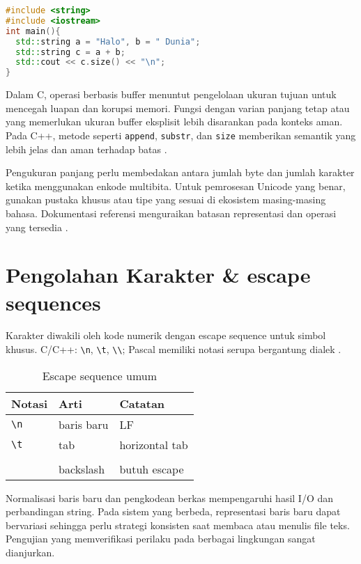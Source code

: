 \documentclass[../main.tex]{subfiles}
\begin{document}
\begin{lstlisting}[language=C++, caption={std::string di C++}]
#include <string>
#include <iostream>
int main(){
  std::string a = "Halo", b = " Dunia";
  std::string c = a + b;
  std::cout << c.size() << "\n";
}
\end{lstlisting}

Dalam C, operasi berbasis buffer menuntut pengelolaan ukuran tujuan untuk mencegah luapan dan korupsi memori. Fungsi dengan varian panjang tetap atau yang memerlukan ukuran buffer eksplisit lebih disarankan pada konteks aman. Pada C++, metode seperti \texttt{append}, \texttt{substr}, dan \texttt{size} memberikan semantik yang lebih jelas dan aman terhadap batas \parencite{cpp-strings}.

Pengukuran panjang perlu membedakan antara jumlah byte dan jumlah karakter ketika menggunakan enkode multibita. Untuk pemrosesan Unicode yang benar, gunakan pustaka khusus atau tipe yang sesuai di ekosistem masing-masing bahasa. Dokumentasi referensi menguraikan batasan representasi dan operasi yang tersedia \parencite{cpp-strings,iso-c-draft-n1570}.

\section{Pengolahan Karakter \& escape sequences}
Karakter diwakili oleh kode numerik dengan escape sequence untuk simbol khusus. C/C++: \texttt{\textbackslash n}, \texttt{\textbackslash t}, \texttt{\textbackslash\textbackslash}; Pascal memiliki notasi serupa bergantung dialek \parencite{iso-c-draft-n1570,free-pascal-docs}.

\begin{table}[h]
  \centering
  \caption{Escape sequence umum}
  \begin{tabular}{@{}lll@{}}
    \toprule
    Notasi & Arti & Catatan \\
    \midrule
    \texttt{\textbackslash n} & baris baru & LF \\
    \texttt{\textbackslash t} & tab & horizontal tab \\
    \texttt{\\} & backslash & butuh escape \\
    \bottomrule
  \end{tabular}
\end{table}

Normalisasi baris baru dan pengkodean berkas mempengaruhi hasil I/O dan perbandingan string. Pada sistem yang berbeda, representasi baris baru dapat bervariasi sehingga perlu strategi konsisten saat membaca atau menulis file teks. Pengujian yang memverifikasi perilaku pada berbagai lingkungan sangat dianjurkan.
\end{document}
